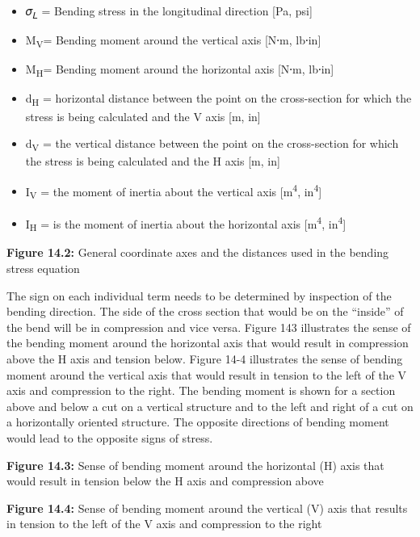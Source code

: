 \documentclass[
  letterpaper,
  DIV=11,
  numbers=noendperiod]{scrreprt}
\begin{document}
\begin{itemize}
\item
  𝜎\textsubscript{𝐿} = Bending stress in the longitudinal direction
  {[}Pa, psi{]}
\item
  M\textsubscript{V}= Bending moment around the vertical axis {[}N⸱m,
  lb⸱in{]}
\item
  M\textsubscript{H}= Bending moment around the horizontal axis {[}N⸱m,
  lb⸱in{]}
\item
  d\textsubscript{H} = horizontal distance between the point on the
  cross-section for which the stress is being calculated and the V axis
  {[}m, in{]}
\item
  d\textsubscript{V} = the vertical distance between the point on the
  cross-section for which the stress is being calculated and the H axis
  {[}m, in{]}
\item
  I\textsubscript{V} = the moment of inertia about the vertical axis
  {[}m\textsuperscript{4}, in\textsuperscript{4}{]}
\item
  I\textsubscript{H} = is the moment of inertia about the horizontal
  axis {[}m\textsuperscript{4}, in\textsuperscript{4}{]}
\end{itemize}

\textbf{Figure 14.2:} General coordinate axes and the distances used in
the bending stress equation

The sign on each individual term needs to be determined by inspection of
the bending direction. The side of the cross section that would be on
the ``inside'' of the bend will be in compression and vice versa. Figure
143 illustrates the sense of the bending moment around the horizontal
axis that would result in compression above the H axis and tension
below. Figure 14-4 illustrates the sense of bending moment around the
vertical axis that would result in tension to the left of the V axis and
compression to the right. The bending moment is shown for a section
above and below a cut on a vertical structure and to the left and right
of a cut on a horizontally oriented structure. The opposite directions
of bending moment would lead to the opposite signs of stress.

\textbf{Figure 14.3:} Sense of bending moment around the horizontal (H)
axis that would result in tension below the H axis and compression above

\textbf{Figure 14.4:} Sense of bending moment around the vertical (V)
axis that results in tension to the left of the V axis and compression
to the right
\end{document}
